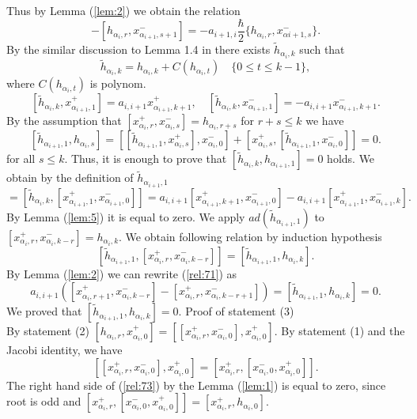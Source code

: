 \documentclass[english]{elsarticle}
\numberwithin{equation}{section}
\begin{document}
Thus by Lemma (\ref{lem:2}) we obtain the relation
\begin{equation}
[h_{\alpha_i,r+1},x_{\alpha_{i+1},s}^-]-[h_{\alpha_i,r},x_{\alpha_{i+1},s+1}^-]= -a_{i+1,i}\frac{\hbar}{2}\{h_{\alpha_i,r},x_{\alpha{i+1},s}^-\}.
\end{equation}
By the similar discussion to Lemma 1.4 in \cite{Levendorski} there exists $\tilde{h}_{\alpha_i,k}$ such that
\[
    \tilde{h}_{\alpha_i,k}=h_{\alpha_i,k}+C(h_{\alpha_i,t}) \quad \{0\leq t \leq k-1\},
\]
where $C(h_{\alpha_i,t})$ is polynom.
\[
[\tilde{h}_{\alpha_i,k},x_{\alpha_{i+1},1}^+]=a_{i,i+1}x_{\alpha_{i+1},k+1}^+, \quad [\tilde{h}_{\alpha_i,k},x_{\alpha_{i+1},1}^-]=-a_{i,i+1}x_{\alpha_{i+1},k+1}^-.
\]
By the assumption that  $[x_{\alpha_i,r}^+,x_{\alpha_i,s}^-]=h_{\alpha_i,r+s}$ for $r+s\leq k$ we have
\[
[\tilde{h}_{\alpha_{i+1},1},h_{\alpha_i,s}]= [[\tilde{h}_{\alpha_{i+1},1},x_{\alpha_i,s}^+],x_{\alpha_i,0}^-]+ [x_{\alpha_i,s}^+,[\tilde{h}_{\alpha_{i+1},1},x_{\alpha_i,0}^-]]=0.
\]
for all $s\leq k$. Thus, it is enough to prove that $[\tilde{h}_{\alpha_{i},k},h_{\alpha_{i+1},1}]=0$ holds. We obtain by the definition of $\tilde{h}_{\alpha_{i+1},1}$
\begin{equation}
[\tilde{h}_{\alpha_{i},k},h_{\alpha_{i+1},1}] = [\tilde{h}_{\alpha_{i},k},[x_{\alpha_{i+1},1}^+,x_{\alpha_{i+1},0}^-]]= a_{i,i+1}[x_{\alpha_{i+1},k+1}^+,x_{\alpha_{i+1},0}^-] - a_{i,i+1}[x_{\alpha_{i+1},1}^+,x_{\alpha_{i+1},k}^-].
\end{equation}
By Lemma (\ref{lem:5}) it is equal to zero.
We apply $ad(\tilde{h}_{\alpha_{i+1},1})$ to $[x_{\alpha_i,r}^+,x_{\alpha_i,k-r}^-]=h_{\alpha_i,k}$. We obtain following relation by induction hypothesis
\begin{equation}
\label{rel:71}
    [\tilde{h}_{\alpha_{i+1},1},[x_{\alpha_i,r}^+,x_{\alpha_i,k-r}^-]] = [\tilde{h}_{\alpha_{i+1},1},h_{\alpha_i,k}].
\end{equation}
By Lemma (\ref{lem:2}) we can rewrite (\ref{rel:71}) as
\begin{equation}
a_{i,i+1}([x_{\alpha_i,r+1}^+,x_{\alpha_i,k-r}^-]- [x_{\alpha_i,r}^+,x_{\alpha_i,k-r+1}^-])= [\tilde{h}_{\alpha_{i+1},1},h_{\alpha_i,k}]=0.
\end{equation}
We proved that $[\tilde{h}_{\alpha_{i+1},1},h_{\alpha_i,k}]=0$.
Proof of statement (3)\\
By statement (2) $[h_{\alpha_i,r},x_{\alpha_i,0}^+]=[[x_{\alpha_i,r}^+,x_{\alpha_i,0}^-],x_{\alpha_i,0}^+]$. By statement (1) and the Jacobi identity, we have
\begin{equation}
\label{rel:73}
    [[x_{\alpha_i,r}^+,x_{\alpha_i,0}^-],x_{\alpha_i,0}^+]=[x_{\alpha_i,r}^+,[x_{\alpha_i,0}^-,x_{\alpha_i,0}^+]].
\end{equation}
The right hand side of (\ref{rel:73}) by the Lemma (\ref{lem:1}) is equal to zero, since root is odd and $[x_{\alpha_i,r}^+,[x_{\alpha_i,0}^-,x_{\alpha_i,0}^+]] = [x_{\alpha_i,r}^+,h_{\alpha_i,0}]$.\\
\end{document}
